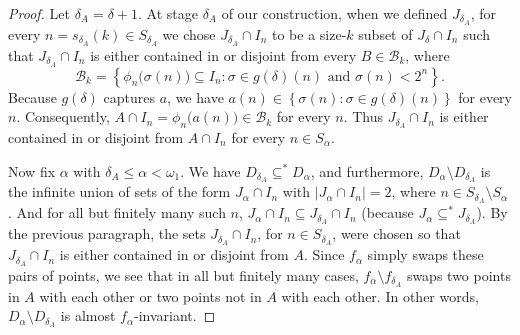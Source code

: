 \documentclass[10pt,a4paper]{amsart}
\newcommand{\B}{\mathcal{B}}
\renewcommand{\a}{\alpha}
\newcommand{\dlt}{\delta}
\newcommand{\explicitSet}[1]{\left\lbrace #1 \right\rbrace}
\newcommand{\s}{\sigma}
\newcommand{\set}[2]{\explicitSet{#1 \colon #2}}
\newcommand{\sub}{\subseteq}
\newcommand{\w}{\omega}
\begin{document}
\begin{proof}
Let $\dlt_A = \dlt+1$. 
At stage $\dlt_A$ of our construction, when we defined $J_{\dlt_A}$, 
for every $n = s_{\dlt_A}(k) \in S_{\dlt_A}$ we chose $J_{\dlt_A} \cap I_n$ to be a size-$k$ subset of $J_{\dlt} \cap I_n$ such that $J_{\dlt_A} \cap I_n$ is either contained in or disjoint from every $B \in \B_k$, where 
$$\B_k = \set{\phi_n\big(\s(n)\big) \sub I_n}{\s \in g(\dlt)(n) \text{ and }\s(n) < 2^n}.$$ 
Because $g(\dlt)$ captures $a$, we have $a(n) \in \set{\s(n)}{\s \in g(\dlt)(n)}$ for every $n$. 
Consequently, $A \cap I_n = \phi_n\big(a(n)\big) \in \B_k$ for every $n$. 
Thus $J_{\dlt_A} \cap I_n$ is either contained in or disjoint from $A \cap I_n$ for every $n \in S_\a$. 

Now fix $\a$ with $\dlt_A \leq \a < \w_1$. 
We have $D_{\dlt_A} \sub^* D_\a$, and furthermore, $D_\a \setminus D_{\dlt_A}$ is the infinite union of sets of the form $J_\a \cap I_n$ with $|J_\a \cap I_n| = 2$, where $n \in S_{\dlt_A} \!\setminus S_\a$. 
And for all but finitely many such $n$, $J_\a \cap I_n \sub J_{\dlt_A} \cap I_n$ (because $J_\a \sub^* J_{\dlt_A}$). By the previous paragraph, the sets $J_{\dlt_A} \cap I_n$, for $n \in S_{\dlt_A}$, were chosen so that $J_{\dlt_A} \cap I_n$ is either contained in or disjoint from $A$. 
Since $f_\a$ simply swaps these pairs of points, we see that in all but finitely many cases, $f_\a \setminus f_{\dlt_A}$ swaps two points in $A$ with each other or two points not in $A$ with each other. In other words, $D_\a \setminus D_{\dlt_A}$ is almost $f_\a$-invariant.
\end{proof}
\end{document}
